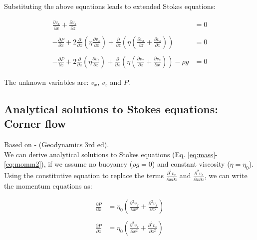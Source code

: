 \documentclass[a4paper,11pt]{article}
\begin{document}
Substituting the above equations leads to extended Stokes equations:

\begin{align}
\frac{\displaystyle \partial v_x}{\displaystyle \partial x}+\frac{\displaystyle \partial v_z}{\displaystyle \partial z} &= 0  \label{eq:mass}\\
& \nonumber \\ 
-\frac{\displaystyle \partial P}{\displaystyle \partial x}+2\frac{\displaystyle \partial}{\displaystyle \partial x}\left(\eta\frac{\displaystyle \partial v_x}{\displaystyle \partial x}\right)+\frac{\displaystyle \partial}{\displaystyle \partial z}\left(\eta\left(\frac{\displaystyle \partial v_x}{\displaystyle \partial z}+\frac{\displaystyle \partial v_z}{\displaystyle \partial x}\right)\right) &= 0  \label{eq:momm1}\\
&\nonumber  \\
-\frac{\displaystyle \partial P}{\displaystyle \partial z}+2\frac{\displaystyle \partial}{\displaystyle \partial z}\left(\eta\frac{\displaystyle \partial v_z}{\displaystyle \partial z}\right)+\frac{\displaystyle \partial}{\displaystyle \partial x}\left(\eta\left(\frac{\displaystyle \partial v_x}{\displaystyle \partial z}+\frac{\displaystyle \partial v_z}{\displaystyle \partial x}\right)\right) - \rho g &= 0  \label{eq:momm2}
\end{align}

The unknown variables are: $v_x$, $v_z$ and $P$. 

\subsection{Analytical solutions to Stokes equations: Corner flow}
Based on \citet{Spiegelman1987,Turcotte2014} - (Geodynamics 3rd ed).\\

We can derive analytical solutions to Stokes equations (Eq. \ref{eq:mass}-\ref{eq:momm2}), if we assume no buoyancy ($\rho g =0$) and constant viscosity ($\eta = \eta_0$). Using the constitutive equation to replace the terms $\frac{\partial^2 v_x}{\partial x\partial z}$ and $\frac{\partial^2 v_z}{\partial x\partial z}$, we can write the momentum equations as:

\begin{align}
\frac{\displaystyle \partial P}{\displaystyle \partial x}&=\eta_0\left(\frac{\displaystyle \partial^2 v_x}{\displaystyle \partial x^2} + \frac{\displaystyle \partial^2 v_x}{\displaystyle \partial z^2}\right) \label{eq:momm1-sim}\\
&\nonumber  \\
\frac{\displaystyle \partial P}{\displaystyle \partial z}&=\eta_0\left(\frac{\displaystyle \partial^2 v_z}{\displaystyle \partial x^2} + \frac{\displaystyle \partial^2 v_z}{\displaystyle \partial z^2}\right) \label{eq:momm2-sim}
\end{align}
\end{document}
